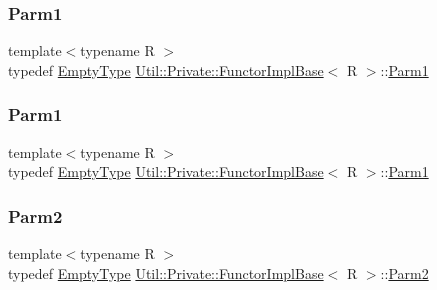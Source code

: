 \subsubsection{\texorpdfstring{Parm1}{Parm1}\hspace{0.1cm}{\footnotesize\ttfamily [2/3]}}
{\footnotesize\ttfamily template$<$typename R $>$ \\
typedef \mbox{\hyperlink{classUtil_1_1EmptyType}{Empty\+Type}} \mbox{\hyperlink{structUtil_1_1Private_1_1FunctorImplBase}{Util\+::\+Private\+::\+Functor\+Impl\+Base}}$<$ R $>$\+::\mbox{\hyperlink{structUtil_1_1Private_1_1FunctorImplBase_a9d61e693d6c616dea5bd9d9073c7d21a}{Parm1}}}

\mbox{\label{structUtil_1_1Private_1_1FunctorImplBase_a9d61e693d6c616dea5bd9d9073c7d21a}} 
\subsubsection{\texorpdfstring{Parm1}{Parm1}\hspace{0.1cm}{\footnotesize\ttfamily [3/3]}}
{\footnotesize\ttfamily template$<$typename R $>$ \\
typedef \mbox{\hyperlink{classUtil_1_1EmptyType}{Empty\+Type}} \mbox{\hyperlink{structUtil_1_1Private_1_1FunctorImplBase}{Util\+::\+Private\+::\+Functor\+Impl\+Base}}$<$ R $>$\+::\mbox{\hyperlink{structUtil_1_1Private_1_1FunctorImplBase_a9d61e693d6c616dea5bd9d9073c7d21a}{Parm1}}}

\mbox{\label{structUtil_1_1Private_1_1FunctorImplBase_a554085cd798ef14838a59b528f0feb2e}} 
\subsubsection{\texorpdfstring{Parm2}{Parm2}\hspace{0.1cm}{\footnotesize\ttfamily [1/3]}}
{\footnotesize\ttfamily template$<$typename R $>$ \\
typedef \mbox{\hyperlink{classUtil_1_1EmptyType}{Empty\+Type}} \mbox{\hyperlink{structUtil_1_1Private_1_1FunctorImplBase}{Util\+::\+Private\+::\+Functor\+Impl\+Base}}$<$ R $>$\+::\mbox{\hyperlink{structUtil_1_1Private_1_1FunctorImplBase_a554085cd798ef14838a59b528f0feb2e}{Parm2}}}


